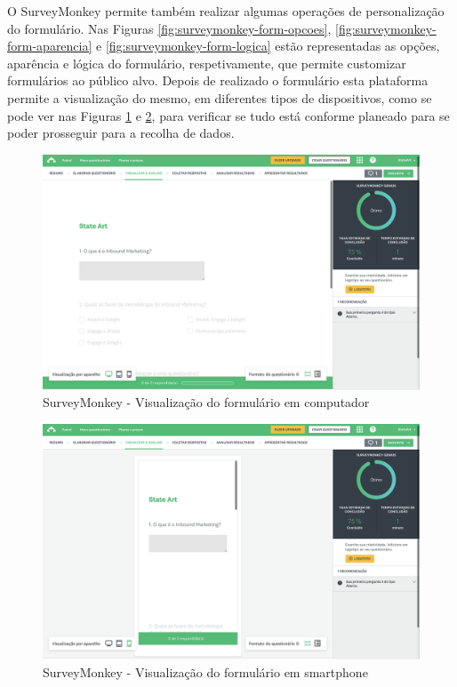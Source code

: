 O SurveyMonkey permite também realizar algumas operações de personalização do formulário. Nas Figuras \ref{fig:surveymonkey-form-opcoes}, \ref{fig:surveymonkey-form-aparencia} e \ref{fig:surveymonkey-form-logica} estão representadas as opções, aparência e lógica do formulário, respetivamente, que permite customizar formulários ao público alvo. 
Depois de realizado o formulário esta plataforma permite a visualização do mesmo, em diferentes tipos de dispositivos, como se pode ver nas Figuras \ref{fig:surveymonkey-form-test-pc} e \ref{fig:surveymonkey-form-test-phone}, para verificar se tudo está conforme planeado para se poder prosseguir para a recolha de dados. 
\newpage

\begin{figure}[ht!]
	\begin{center}
		\includegraphics[width=1\textwidth]{img/sm/surveymonkey-form-test-pc}
		\caption{SurveyMonkey - Visualização do formulário em computador }
		\label{fig:surveymonkey-form-test-pc}
	\end{center}
\end{figure}

\begin{figure}[ht!]
	\begin{center}
		\includegraphics[width=1\textwidth]{img/sm/surveymonkey-form-test-phone}
		\caption{SurveyMonkey - Visualização do formulário em smartphone }
		\label{fig:surveymonkey-form-test-phone}
	\end{center}
\end{figure}


